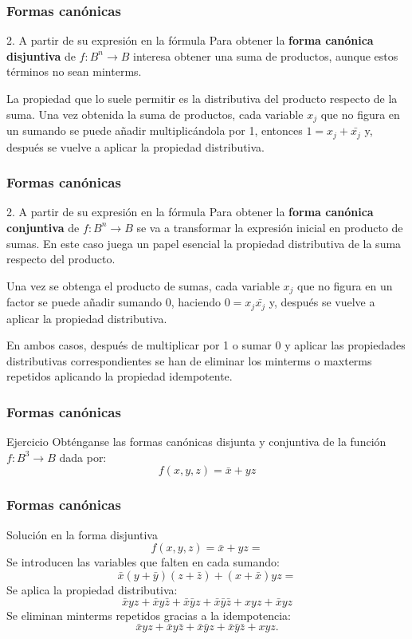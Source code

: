 \documentclass{beamer}
\begin{document}
\begin{frame}
\frametitle{Formas can\'onicas}
\begin{block}{2. A partir de su expresi\'on en la f\'ormula}
Para obtener la \textbf{forma can\'onica disjuntiva} de $f:B^n\longrightarrow B$ interesa obtener una suma de productos, aunque estos t\'erminos no sean minterms.

La propiedad que lo suele permitir es la distributiva del producto respecto de la suma. Una vez obtenida la suma de productos, cada variable $x_j$ que no figura en un sumando se puede a\~nadir multiplic\'andola por 1, entonces $1=x_j+\bar{x_j}$ y, despu\'es se vuelve a aplicar la propiedad distributiva.

\end{block}
\end{frame}



\begin{frame}
\frametitle{Formas can\'onicas}
\begin{block}{2. A partir de su expresi\'on en la f\'ormula}
Para obtener la \textbf{forma can\'onica conjuntiva} de $f:B^n\longrightarrow B$ se va a transformar la expresi\'on inicial en producto de sumas. En este caso juega un papel esencial la propiedad distributiva de la suma respecto del producto.

Una vez se obtenga el producto de sumas, cada variable $x_j$ que no figura en un factor se puede a\~nadir sumando 0, haciendo $0=x_j\bar{x_j}$ y, despu\'es se vuelve a aplicar la propiedad distributiva.
\end{block}

En ambos casos, despu\'es de multiplicar por 1 o sumar 0 y aplicar las propiedades distributivas correspondientes se han de eliminar los minterms o maxterms repetidos aplicando la propiedad idempotente.
\end{frame}





\begin{frame}
\frametitle{Formas can\'onicas}
\begin{block}{Ejercicio}
Obt\'enganse las formas can\'onicas disjunta y conjuntiva de la funci\'on $f:B^3\longrightarrow B$ dada por: 
\[f(x,y,z) = \bar{x} + yz\]
\end{block}
\end{frame}




\begin{frame}
\frametitle{Formas can\'onicas}
\begin{block}{Soluci\'on en la forma disjuntiva}
\[f(x,y,z) = \bar{x} + yz =\]
Se introducen las variables que falten en cada sumando:
\[ \bar{x}(y+\bar{y})(z+\bar z) + (x+\bar x)yz = \]
Se aplica la propiedad distributiva:
\[\bar x yz + \bar xy\bar z + \bar x \bar y z + \bar x \bar y \bar z + xyz + \bar x y z\]
Se eliminan minterms repetidos gracias a la idempotencia:
\[\bar x yz + \bar xy\bar z + \bar x \bar y z + \bar x \bar y \bar z + xyz .\]

\end{block}
\end{frame}
\end{document}
